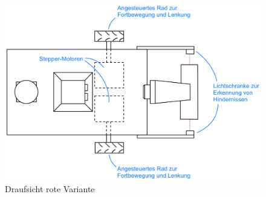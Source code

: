 \documentclass[main.tex]{subfiles} %
\begin{document}
\begin{landscape}
    \newpage

    \begin{figure}[h] %
        \centering %
        \includegraphics[width=1\textwidth]{./Skizzen/Sketch_Top.png} %
        \caption{Draufsicht rote Variante} %
        \label{fig:Sketch_Top} %
    \end{figure}

\end{landscape} %
\end{document}
